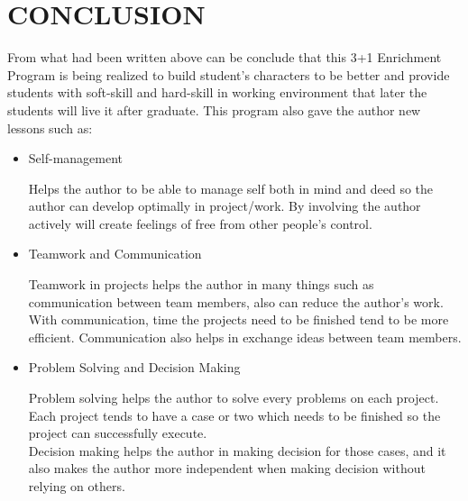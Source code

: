 \chapter{CONCLUSION}
From what had been written above can be conclude that this 3+1 Enrichment Program is being realized to build student's characters to be better and provide students with soft-skill and hard-skill in working environment that later the students will live it after graduate. This program also gave the author new lessons such as:

\begin{itemize}
\item Self-management

Helps the author to be able to manage self both in mind and deed so the author can develop optimally in project/work. By involving the author actively will create feelings of free from other people's control.

\item Teamwork and Communication

Teamwork in projects helps the author in many things such as communication between team members, also can reduce the author's work. With communication, time the projects need to be finished tend to be more efficient. Communication also helps in exchange ideas between team members.

\item Problem Solving and Decision Making

Problem solving helps the author to solve every problems on each project. Each project tends to have a case or two which needs to be finished so the project can successfully execute.\\

Decision making helps the author in making decision for those cases, and it also makes the author more independent when making decision without relying on others.
\end{itemize}
